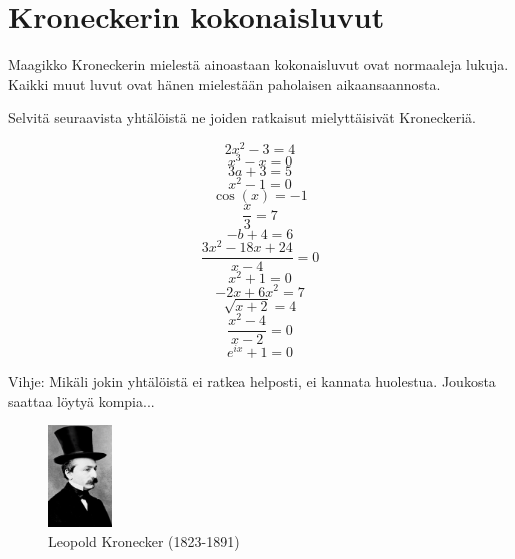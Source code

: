 \clearpage

\section{Kroneckerin kokonaisluvut}

Maagikko Kroneckerin mielestä ainoastaan kokonaisluvut ovat normaaleja lukuja. Kaikki muut luvut ovat hänen mielestään paholaisen aikaansaannosta.


Selvitä seuraavista yhtälöistä ne joiden ratkaisut mielyttäisivät Kroneckeriä.

\begin{equation}
2x^2-3=4
\end{equation}
\begin{equation}
x^3-x=0
\end{equation}
\begin{equation}
3a+3=5
\end{equation}
\begin{equation}
x^2-1=0
\end{equation}
\begin{equation}
\cos(x)=-1
\end{equation}
\begin{equation}
\frac{x}{3}=7
\end{equation}
\begin{equation}
-b+4=6
\end{equation}
\begin{equation}
\frac{3x^2-18x+24}{x-4}=0
\end{equation}
\begin{equation}
x^2+1=0
\end{equation}
\begin{equation}
-2x+6x^2=7
\end{equation}
\begin{equation}
\sqrt{x+2}=4
\end{equation}
\begin{equation}
\frac{x^2-4}{x-2}=0
\end{equation}
\begin{equation}
e^{ix}+1=0
\end{equation}

Vihje: Mikäli jokin yhtälöistä ei ratkea helposti, ei kannata huolestua. Joukosta saattaa löytyä kompia...

\begin{figure}[h]
    \centering
    \includegraphics[width=0.15\textwidth]{kuvat/kronecker ja hattu.png}
    \caption*{Leopold Kronecker (1823-1891)}
\end{figure}
